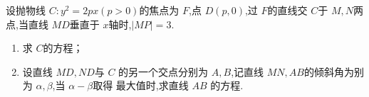 \documentclass[class=ctexart,crop=false]{standalone}
\begin{document}
设抛物线 $C:y^2=2px(p>0)$的焦点为 $F$,点 $D(p,0)$,过 $F$的直线交 $C$于 $M,N$两点,当直线 $MD$垂直于 $x$轴时,$|MP|=3$.
\begin{enumerate}[label=(\arabic*)]
    \item 求 $C$的方程；
    \item 设直线 $MD,ND$与 $C$ 的另一个交点分别为 $A,B$,记直线 $MN,AB$的倾斜角为别为 $\alpha,\beta$,当 $\alpha-\beta$取得
    最大值时,求直线 $AB$ 的方程.
\end{enumerate}
\end{document}
